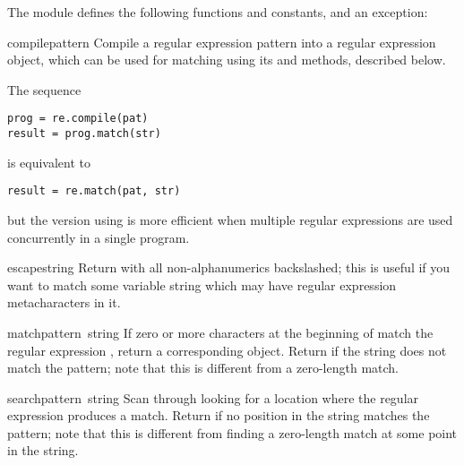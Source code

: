 The module defines the following functions and constants, and an exception:

\renewcommand{\indexsubitem}{(in module re)}

\begin{funcdesc}{compile}{pattern}
  Compile a regular expression pattern into a regular expression
  object, which can be used for matching using its  and
   methods, described below.  

  The sequence
%
\bcode\begin{verbatim}
prog = re.compile(pat)
result = prog.match(str)
\end{verbatim}\ecode
%
is equivalent to
%
\bcode\begin{verbatim}
result = re.match(pat, str)
\end{verbatim}\ecode
%
but the version using  is more efficient when multiple
regular expressions are used concurrently in a single program.  
\end{funcdesc}

\begin{funcdesc}{escape}{string}
Return  with all non-alphanumerics backslashed; this is
useful if you want to match some variable string which may have
regular expression metacharacters in it.
\end{funcdesc}

\begin{funcdesc}{match}{pattern\, string}
  If zero or more characters at the beginning of  match
  the regular expression , return a corresponding
   object.  Return  if the string does not
  match the pattern; note that this is different from a zero-length
  match.
\end{funcdesc}

\begin{funcdesc}{search}{pattern\, string}
  Scan through  looking for a location where the regular
  expression  produces a match.  Return  if no
  position in the string matches the pattern; note that this is
  different from finding a zero-length match at some point in the string.
\end{funcdesc}

